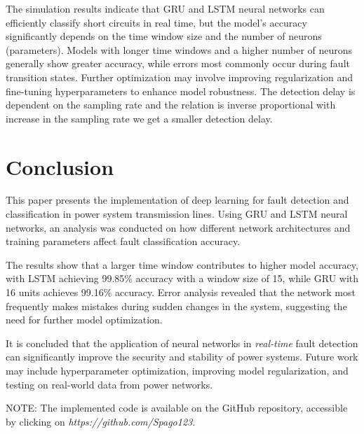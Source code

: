 \documentclass[11pt]{IEEEtran}
\begin{document}
The simulation results indicate that GRU and LSTM neural networks can efficiently classify short circuits in real time, but the model's accuracy significantly depends on the time window size and the number of neurons (parameters). Models with longer time windows and a higher number of neurons generally show greater accuracy, while errors most commonly occur during fault transition states. Further optimization may involve improving regularization and fine-tuning hyperparameters to enhance model robustness. The detection delay is dependent on the sampling rate and the relation is inverse proportional with increase in the sampling rate we get a smaller detection delay.

\section{Conclusion}
This paper presents the implementation of deep learning for fault detection and classification in power system transmission lines. Using GRU and LSTM neural networks, an analysis was conducted on how different network architectures and training parameters affect fault classification accuracy.

The results show that a larger time window contributes to higher model accuracy, with LSTM achieving 99.85\% accuracy with a window size of 15, while GRU with 16 units achieves 99.16\% accuracy. Error analysis revealed that the network most frequently makes mistakes during sudden changes in the system, suggesting the need for further model optimization.

It is concluded that the application of neural networks in \textit{real-time} fault detection can significantly improve the security and stability of power systems. Future work may include hyperparameter optimization, improving model regularization, and testing on real-world data from power networks.

NOTE: The implemented code is available on the GitHub repository, accessible by clicking on \textit{https://github.com/Spago123}.



\end{document}
